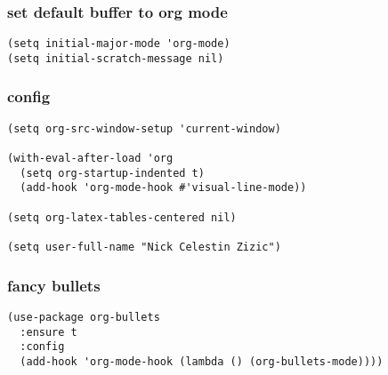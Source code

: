 \documentclass[11pt]{article}
\begin{document}
\subsubsection{set default buffer to org mode}
\label{sec:org8606918}
\begin{verbatim}
(setq initial-major-mode 'org-mode)
(setq initial-scratch-message nil)
\end{verbatim}
\subsubsection{config}
\label{sec:org10ad451}
\begin{verbatim}
(setq org-src-window-setup 'current-window)

(with-eval-after-load 'org
  (setq org-startup-indented t)
  (add-hook 'org-mode-hook #'visual-line-mode))

(setq org-latex-tables-centered nil)

(setq user-full-name "Nick Celestin Zizic")
\end{verbatim}
\subsubsection{fancy bullets}
\label{sec:org1e82931}
\begin{verbatim}
(use-package org-bullets
  :ensure t
  :config
  (add-hook 'org-mode-hook (lambda () (org-bullets-mode))))
\end{verbatim}
\end{document}
